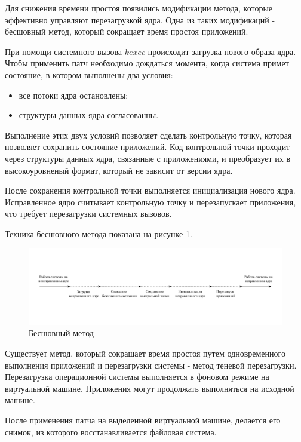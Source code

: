 Для снижения времени простоя появились модификации метода, которые эффективно управляют перезагрузкой ядра. Одна из таких модификаций - бесшовный метод, который сокращает время простоя приложений.

При помощи системного вызова $kexec$ происходит загрузка нового образа ядра. Чтобы применить патч необходимо дождаться момента, когда система примет состояние, в котором выполнены два условия:
\begin{itemize}
	\item все потоки ядра остановлены;
	\item структуры данных ядра согласованны.
\end{itemize}

Выполнение этих двух условий позволяет сделать контрольную точку, которая позволяет сохранить состояние приложений. Код контрольной точки проходит через структуры данных ядра, связанные с приложениями, и преобразует их в высокоуровненый формат, который не зависит от версии ядра. 

После сохранения контрольной точки выполняется инициализация нового ядра. Исправленное ядро считывает контрольную точку и перезапускает приложения, что требует перезагрузки системных вызовов.

Техника бесшовного метода показана на рисунке \ref{img:seemless}.

\begin{figure}[H]
	\begin{center}
		\includegraphics[scale=0.7]{img/seemless.pdf}
	\end{center}
	\captionsetup{justification=centering}
	\caption{Бесшовный метод}
	\label{img:seemless}
\end{figure}

Существует метод, который сокращает время простоя путем одновременного выполнения приложений и перезагрузки системы - метод теневой перезагрузки. Перезагрузка операционной системы выполняется в фоновом режиме на виртуальной машине. Приложения могут продолжать выполняться на исходной машине.

После применения патча на выделенной виртуальной машине, делается его снимок, из которого восстанавливается файловая система.

